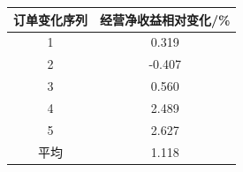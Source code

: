 \begin{tabular}{cc}
\toprule
订单变化序列 & 经营净收益相对变化/\% \\
\midrule
1 & 0.319 \\
2 & -0.407 \\
3 & 0.560 \\
4 & 2.489 \\
5 & 2.627 \\
\midrule
平均 & 1.118 \\
\bottomrule
\end{tabular}

